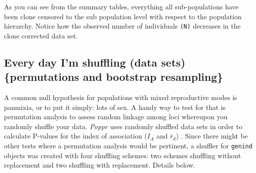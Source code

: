 \documentclass[letterpaper]{article}
\newcommand{\tab}{\hspace*{1em}}
\begin{document}
As you can see from the summary tables, everything all sub-populations have been clone censored to the sub population level with respect to the population hierarchy. Notice how the observed number of individuals \texttt{(N)} decreases in the clone corrected data set.
\subsection{Every day I'm shuffling (data sets)  \{permutations and bootstrap resampling\}}

\tab\tab A common null hypothesis for populations with mixed reproductive modes is panmixia, or to put it simply: lots of sex. A handy way to test for that is permutation analysis to assess random linkage among loci whereupon you randomly shuffle your data. \textit{Poppr} uses randomly shuffled data sets in order to calculate P-values for the index of association ($I_A$ and $\bar r_d$) \cite{Agapow:2001}. Since there might be other tests where a permutation analysis would be pertinent, a shuffler for \texttt{genind} objects was created with four shuffling schemes: two schemes shuffling without replacement and two shuffling with replacement. Details below.
\end{document}
